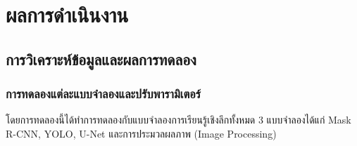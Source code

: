 \documentclass[12pt,oneside,openright,a4paper]{cpe-thai-project}
\begin{document}
\chapter{ผลการดำเนินงาน}

\section{การวิเคราะห์ข้อมูลและผลการทดลอง}
\subsection{การทดลองแต่ละแบบจำลองและปรับพารามิเตอร์}
โดยการทดลองนี้ได้ทำการทดลองกับแบบจำลองการเรียนรู้เชิงลึกทั้งหมด 3 แบบจำลองได้แก่ Mask R-CNN, YOLO, U-Net และการประมวลผลภาพ (Image Processing) 
\end{document}

